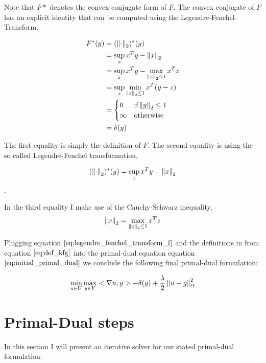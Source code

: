 Note that $F*$ denotes the convex conjugate form of $F$. The convex conjugate of $F$ has an explicit identity that can be computed using the Legendre-Fenchel-Transform.

\begin{align}
	F^*(y) &= (\left\lVert\cdot\right\rVert_2)^*(y) \nonumber \\
		  &= \sup_x x^T y - \left\lVert x\right\rVert_2 \nonumber \\
		  &= \sup_x x^T y - \max_{\left\lVert z\right\rVert_2 \leq 1} x^T z \nonumber \\
		  &= \sup_x \min_{\left\lVert z\right\rVert_2 \leq 1} x^T(y-z) \nonumber \\
		  &= \begin{cases}
   				0  			& \text{if} \left\lVert y\right\rVert_2 \leq 1 \\
   				\infty      & \text{otherwise}
  			 \end{cases} \nonumber \\
  		  &= \delta(y)
\label{eq:legendre_fenchel_transform_f}  		  
\end{align}

The first equality is simply the definition of $F$. The second equality is using the so called Legendre-Fenchel transformation,

\begin{equation}
	(\left\lVert\cdot\right\rVert_2)^*(y) = \sup_x x^T y - \left\lVert x\right\rVert_2 \nonumber
\end{equation}. 

In the third equality I make use of the Cauchy-Schwarz inequality, 
\begin{equation}
	\left\lVert x\right\rVert_2 = \max_{\left\lVert z\right\rVert_2 \leq 1} x^T z
\end{equation}


Plugging equation $\ref{eq:legendre_fenchel_transform_f}$ and the definitions in from equation $\ref{eq:def_kfg}$ into the primal-dual equation equation $\ref{eq:initial_primal_dual}$ we conclude the following final primal-dual formulation:

\begin{equation}
\min_{u \in U} \max_{y \in Y} <\nabla u, y> - \delta(y) + \frac{\lambda}{2}\left\lVert u - g\right\rVert^2_{\Omega}
\label{eq:final_primal_dual}
\end{equation}


\section{Primal-Dual steps}
In this section I will present an iterative solver for our stated primal-dual formulation.

